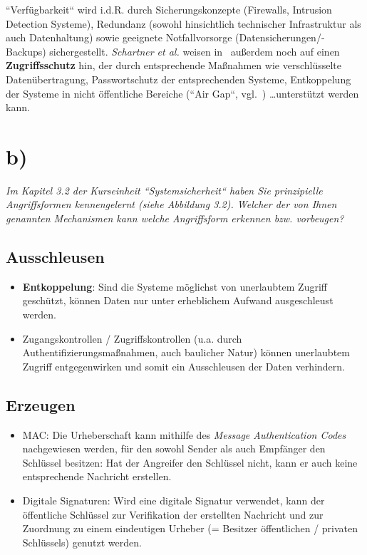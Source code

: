 \noindent
``Verfügbarkeit`` wird i.d.R. durch Sicherungskonzepte (Firewalls, Intrusion Detection Systeme), Redundanz (sowohl hinsichtlich technischer Infrastruktur als auch Datenhaltung) sowie geeignete Notfallvorsorge (Datensicherungen/-Backups) sichergestellt.
\textit{Schartner et al.} weisen in~\cite[\textbf{Tab. 3.1}, 24]{ITS1} außerdem noch auf einen \textbf{Zugriffsschutz} hin, der durch entsprechende Maßnahmen wie verschlüsselte Datenübertragung, Passwortschutz der entsprechenden Systeme, Entkoppelung der Systeme in nicht öffentliche Bereiche (``Air Gap``, vgl.~\cite{RFC4949}) \ldots unterstützt werden kann.

\section{b)}

\noindent
\textit{Im Kapitel 3.2 der Kurseinheit ``Systemsicherheit`` haben Sie prinzipielle Angriffsformen kennengelernt (siehe Abbildung 3.2).
Welcher der von Ihnen genannten Mechanismen kann welche Angriffsform erkennen bzw. vorbeugen?}

\subsection*{Ausschleusen}
\begin{itemize}
    \itemsep0.5em
    \item \textbf{Entkoppelung}: Sind die Systeme möglichst von unerlaubtem Zugriff geschützt, können Daten nur unter erheblichem Aufwand ausgeschleust werden.
    \item Zugangskontrollen / Zugriffskontrollen (u.a. durch Authentifizierungsmaßnahmen, auch baulicher Natur) können unerlaubtem Zugriff entgegenwirken und somit ein Ausschleusen der Daten verhindern.
\end{itemize}

\subsection*{Erzeugen}
\begin{itemize}
    \itemsep0.5em
    \item {MAC}: Die Urheberschaft kann mithilfe des \textit{Message Authentication Codes} nachgewiesen werden, für den sowohl Sender als auch Empfänger den Schlüssel besitzen: Hat der Angreifer den Schlüssel nicht, kann er auch keine entsprechende Nachricht erstellen.
    \item {Digitale Signaturen}: Wird eine digitale Signatur verwendet, kann der öffentliche Schlüssel zur Verifikation der erstellten Nachricht und zur Zuordnung zu einem eindeutigen Urheber (= Besitzer öffentlichen / privaten Schlüssels) genutzt werden.
\end{itemize}

